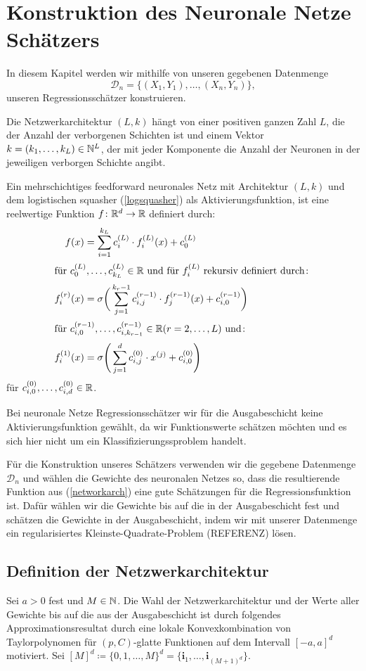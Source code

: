 \chapter{Konstruktion des Neuronale Netze Schätzers}
\label{chap:2}

In diesem Kapitel werden wir mithilfe von unseren gegebenen Datenmenge 
$$ \mathcal{D}_n = \{(X_1, Y_1),\dots,(X_n, Y_n)\},$$
unseren Regressionsschätzer konstruieren. 

Die Netzwerkarchitektur $(L, k)$ hängt von einer positiven ganzen Zahl $L$, die der Anzahl der verborgenen Schichten ist und einem Vektor $k = (k_1,\dots,k_L) \in \mathbb{N}^L$, der mit jeder Komponente die Anzahl der Neuronen in der jeweiligen verborgen Schichte angibt. 

Ein mehrschichtiges feedforward neuronales Netz mit Architektur $(L, k)$ und dem logistischen squasher (\ref{logsquasher}) als Aktivierungsfunktion, ist eine reelwertige Funktion $f\colon \mathbb{R}^d \to \mathbb{R}$ definiert durch:
\begin{align}
\label{networkarch}
f(x) & = \sum_{i = 1}^{k_L} c_i^{(L)} \cdot f_i^{(L)}(x) + c_0^{(L)} \nonumber \\
\intertext{für $c_0^{(L)},\dots,c_{k_L}^{(L)} \in \mathbb{R}$ und für $f_i^{(L)}$ rekursiv definiert durch$\colon$} 
f_i^{(r)}(x) & = \sigma \bigg(\sum_{j = 1}^{k_r - 1} c_{i,j}^{(r - 1)} \cdot f_j^{(r - 1)}(x) + c_{i,0}^{(r - 1)} \bigg)\\
\intertext{für $c_{i,0}^{(r - 1)},\dots,c_{i,k_{r - 1}}^{(r - 1)} \in \mathbb{R} (r = 2,\dots, L)$ und$\colon$}
f_i^{(1)}(x) & = \sigma \Bigg(\sum_{j = 1}^{d} c_{i,j}^{(0)} \cdot x^{(j)} + c_{i,0}^{(0)} \Bigg) \nonumber
\end{align} 
für $c_{i,0}^{(0)},\dots,c_{i,d}^{(0)} \in \mathbb{R}$.

Bei neuronale Netze Regressionsschätzer wir für die Ausgabeschicht keine Aktivierungsfunktion gewählt, da wir Funktionswerte schätzen möchten und es sich hier nicht um ein Klassifizierungssproblem handelt.

Für die Konstruktion unseres Schätzers verwenden wir die gegebene Datenmenge $\mathcal{D}_n$ und wählen die Gewichte des neuronalen Netzes so, dass die resultierende Funktion aus (\ref{networkarch}) eine gute Schätzungen für die Regressionsfunktion ist. Dafür wählen wir die Gewichte bis auf die in der Ausgabeschicht fest und schätzen die Gewichte in der Ausgabeschicht, indem wir mit unserer Datenmenge ein regularisiertes Kleinste-Quadrate-Problem (REFERENZ) lösen.

\section{Definition der Netzwerkarchitektur}
Sei $a > 0$ fest und $M \in \mathbb{N}$. Die Wahl der Netzwerkarchitektur und der Werte aller Gewichte bis auf die aus der Ausgabeschicht ist durch folgendes Approximationsresultat durch eine lokale Konvexkombination von Taylorpolynomen für $(p,C)$-glatte Funktionen auf dem Intervall $[-a, a]^d$ motiviert.
Sei $[M]^d \coloneqq\{0, 1, \dots, M\}^d = \{\mathbf{i}_1,\dots, \mathbf{i}_{(M + 1)^d}\}.$ 

